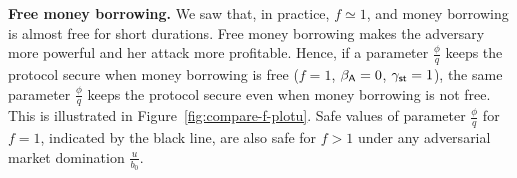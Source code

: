 \noindent
\textbf{Free money borrowing.}
We saw that, in practice, $f \simeq 1$, and money borrowing is almost free
for short durations. Free money borrowing makes the adversary more powerful
and her attack more profitable.
Hence, if a parameter $\frac{\phi}{q}$ keeps the protocol secure when money
borrowing is free ($f = 1$, $\beta_{\textsf{A}} = 0$, $\gamma_{\textsf{st}} = 1$),
the same parameter $\frac{\phi}{q}$ keeps the protocol secure even when
money borrowing is not free. This is illustrated in
Figure~\ref{fig:compare-f-plotu}. Safe values of parameter $\frac{\phi}{q}$
for $f = 1$, indicated by the black line, are also safe for $f > 1$
under any adversarial market domination $\frac{u}{b_0}$.


